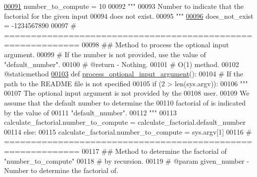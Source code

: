 \begin{DoxyCode}
\hypertarget{get__factorial_8py_source_l00091}{}\hyperlink{classutilities_1_1timing__measurements_1_1get__factorial_1_1calculate__factorial_a04cd527a2af28e713e8665e2d40b1fae}{00091}     number\_to\_compute = 10
00092     \textcolor{stringliteral}{"""}
00093 \textcolor{stringliteral}{        Number to indicate that the factorial for the given input}
00094 \textcolor{stringliteral}{            does not exist.}
00095 \textcolor{stringliteral}{    """}
\hypertarget{get__factorial_8py_source_l00096}{}\hyperlink{classutilities_1_1timing__measurements_1_1get__factorial_1_1calculate__factorial_a16363bc4d672d6352ce3618abeb8e74f}{00096}     does\_not\_exist = -1234567890
00097     \textcolor{comment}{# ============================================================}
00098     \textcolor{comment}{##  Method to process the optional input argument.}
00099     \textcolor{comment}{#   If the number is not provided, use the value of "default\_number".}
00100     \textcolor{comment}{#   @return - Nothing.}
00101     \textcolor{comment}{#   O(1) method.}
00102     @staticmethod
\hypertarget{get__factorial_8py_source_l00103}{}\hyperlink{classutilities_1_1timing__measurements_1_1get__factorial_1_1calculate__factorial_a799aaf842a0c6c98d31ee1cad8381caa}{00103}     \textcolor{keyword}{def }\hyperlink{classutilities_1_1timing__measurements_1_1get__factorial_1_1calculate__factorial_a799aaf842a0c6c98d31ee1cad8381caa}{process\_optional\_input\_argument}():
00104         \textcolor{comment}{# If the path to the README file is not specified}
00105         \textcolor{keywordflow}{if} (2 > len(sys.argv)):
00106             \textcolor{stringliteral}{"""}
00107 \textcolor{stringliteral}{                The optional input argument is not provided by the}
00108 \textcolor{stringliteral}{                    user.}
00109 \textcolor{stringliteral}{                We assume that the default number to determine the}
00110 \textcolor{stringliteral}{                    factorial of is indicated by the value of}
00111 \textcolor{stringliteral}{                    "default\_number".}
00112 \textcolor{stringliteral}{            """}
00113             calculate\_factorial.number\_to\_compute = calculate\_factorial.default\_number
00114         \textcolor{keywordflow}{else}:
00115             calculate\_factorial.number\_to\_compute = sys.argv[1]
00116     \textcolor{comment}{# ============================================================}
00117     \textcolor{comment}{##  Method to determine the factorial of "number\_to\_compute"}
00118     \textcolor{comment}{#       by recursion.}
00119     \textcolor{comment}{#   @param given\_number - Number to determine the factorial of.}

\end{DoxyCode}
